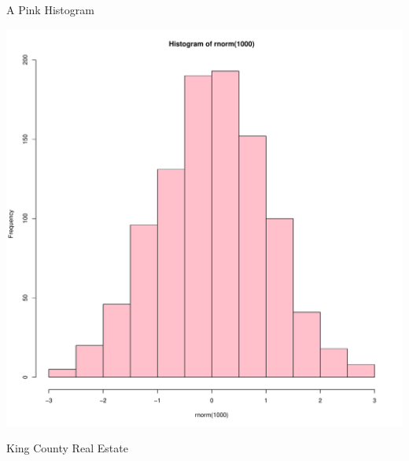 \documentclass[final]{beamer}\usepackage[]{graphicx}\usepackage[]{color}
\makeatletter
\def\maxwidth{ %
  \ifdim\Gin@nat@width>\linewidth
    \linewidth
  \else
    \Gin@nat@width
  \fi
}
\newenvironment{knitrout}{}{} %
\makeatother
\begin{document}
\begin{frame}[fragile]
\begin{columns}[t]
\begin{column}{0.31\linewidth}
\begin{minipage}[t][.955\textheight]{\linewidth}
\begin{block}{A Pink Histogram}
\begin{knitrout}
{\centering \includegraphics[width=\maxwidth]{figure/HIST-1} 

}



\end{knitrout}
\vspace{0ex}
\end{block}
\vfill

\vspace{0ex}
\begin{block}{King County Real Estate}
\vspace{0ex}
\begin{knitrout}
\color{fgcolor}


\end{knitrout}
\end{block}
\end{minipage}
\end{column}
\end{columns}
\end{frame}
\end{document}
